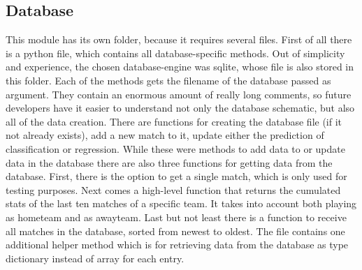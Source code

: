 \subsection{Database}
This module has its own folder, because it requires several files. First of all there is a python file, which contains all database-specific methods. Out of simplicity and experience, the chosen database-engine was sqlite, whose file is also stored in this folder. Each of the methods gets the filename of the database passed as argument. They contain an enormous amount of really long comments, so future developers have it easier to understand not only the database schematic, but also all of the data creation. There are functions for creating the database file (if it not already exists), add a new match to it, update either the prediction of classification or regression. While these were methods to add data to or update data in the database there are also three functions for getting data from the database. First, there is the option to get a single match, which is only used for testing purposes. Next comes a high-level function that returns the cumulated stats of the last ten matches of a specific team. It takes into account both playing as hometeam and as awayteam. Last but not least there is a function to receive all matches in the database, sorted from newest to oldest. The file contains one additional helper method which is for retrieving data from the database as type dictionary instead of array for each entry.

